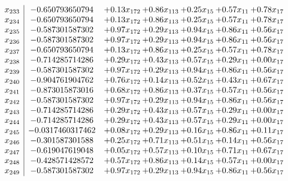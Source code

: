 \documentclass[8pt]{article}
\begin{document}
\[\begin{array}{c| c c@{\hskip 2pt} c@{\hskip 2pt} c@{\hskip 2pt} c@{\hskip 2pt} c@{\hskip 2pt} }
 x_{233}   &  -0.650793650794 & +  0.13 x_{172} & +  0.86 x_{113} & +  0.25 x_{15} & +  0.57 x_{11} & +  0.78 x_{17}\\
 x_{234}   &  -0.650793650794 & +  0.13 x_{172} & +  0.86 x_{113} & +  0.25 x_{15} & +  0.57 x_{11} & +  0.78 x_{17}\\
 x_{235}   &  -0.587301587302 & +  0.97 x_{172} & +  0.29 x_{113} & +  0.94 x_{15} & +  0.86 x_{11} & +  0.56 x_{17}\\
 x_{236}   &  -0.587301587302 & +  0.97 x_{172} & +  0.29 x_{113} & +  0.94 x_{15} & +  0.86 x_{11} & +  0.56 x_{17}\\
 x_{237}   &  -0.650793650794 & +  0.13 x_{172} & +  0.86 x_{113} & +  0.25 x_{15} & +  0.57 x_{11} & +  0.78 x_{17}\\
 x_{238}   &  -0.714285714286 & +  0.29 x_{172} & +  0.43 x_{113} & +  0.57 x_{15} & +  0.29 x_{11} & +  0.00 x_{17}\\
 x_{239}   &  -0.587301587302 & +  0.97 x_{172} & +  0.29 x_{113} & +  0.94 x_{15} & +  0.86 x_{11} & +  0.56 x_{17}\\
 x_{240}   &  -0.904761904762 & +  0.76 x_{172} & +  0.14 x_{113} & +  0.52 x_{15} & +  0.43 x_{11} & +  0.67 x_{17}\\
 x_{241}   &  -0.873015873016 & +  0.68 x_{172} & +  0.86 x_{113} & +  0.37 x_{15} & +  0.57 x_{11} & +  0.56 x_{17}\\
 x_{242}   &  -0.587301587302 & +  0.97 x_{172} & +  0.29 x_{113} & +  0.94 x_{15} & +  0.86 x_{11} & +  0.56 x_{17}\\
 x_{243}   &  -0.714285714286 & +  0.29 x_{172} & +  0.43 x_{113} & +  0.57 x_{15} & +  0.29 x_{11} & +  0.00 x_{17}\\
 x_{244}   &  -0.714285714286 & +  0.29 x_{172} & +  0.43 x_{113} & +  0.57 x_{15} & +  0.29 x_{11} & +  0.00 x_{17}\\
 x_{245}   &  -0.0317460317462 & +  0.08 x_{172} & +  0.29 x_{113} & +  0.16 x_{15} & +  0.86 x_{11} & +  0.11 x_{17}\\
 x_{246}   &  -0.301587301588 & +  0.25 x_{172} & +  0.71 x_{113} & +  0.51 x_{15} & +  0.14 x_{11} & +  0.56 x_{17}\\
 x_{247}   &  -0.619047619048 & +  0.05 x_{172} & +  0.57 x_{113} & +  0.10 x_{15} & +  0.71 x_{11} & +  0.67 x_{17}\\
 x_{248}   &  -0.428571428572 & +  0.57 x_{172} & +  0.86 x_{113} & +  0.14 x_{15} & +  0.57 x_{11} & +  0.00 x_{17}\\
 x_{249}   &  -0.587301587302 & +  0.97 x_{172} & +  0.29 x_{113} & +  0.94 x_{15} & +  0.86 x_{11} & +  0.56 x_{17}\\

\end{array}\]
\end{document}
